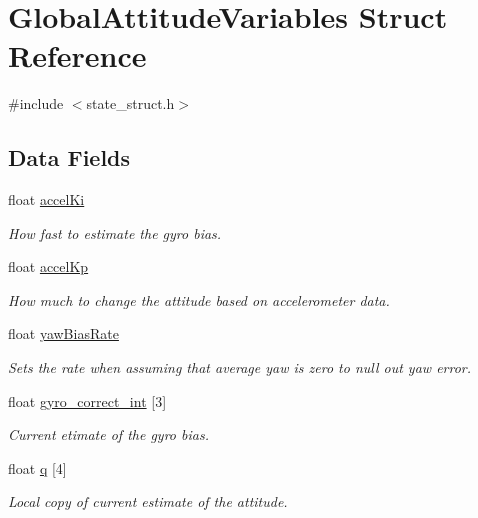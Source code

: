 \hypertarget{struct_global_attitude_variables}{\section{Global\-Attitude\-Variables Struct Reference}
\label{struct_global_attitude_variables}
}


{\ttfamily \#include $<$state\-\_\-struct.\-h$>$}

\subsection*{Data Fields}
\begin{DoxyCompactItemize}
\item 
float \hyperlink{group___state_ga0a9a06d18d9d208192de6edeed98fbe8}{accel\-Ki}
\begin{DoxyCompactList}\small\item\em How fast to estimate the gyro bias. \end{DoxyCompactList}\item 
float \hyperlink{group___state_gaf9246ddec8582b6b47b752019c29b2e4}{accel\-Kp}
\begin{DoxyCompactList}\small\item\em How much to change the attitude based on accelerometer data. \end{DoxyCompactList}\item 
float \hyperlink{group___state_ga0c53c008608a5724b2d563fd5b560905}{yaw\-Bias\-Rate}
\begin{DoxyCompactList}\small\item\em Sets the rate when assuming that average yaw is zero to null out yaw error. \end{DoxyCompactList}\item 
float \hyperlink{group___state_gac754011cf55a0c78cb770e48567802ba}{gyro\-\_\-correct\-\_\-int} \mbox{[}3\mbox{]}
\begin{DoxyCompactList}\small\item\em Current etimate of the gyro bias. \end{DoxyCompactList}\item 
float \hyperlink{group___state_ga34a6662a3aea49780925afa629a917cf}{q} \mbox{[}4\mbox{]}
\begin{DoxyCompactList}\small\item\em Local copy of current estimate of the attitude. \end{DoxyCompactList}\item 

\end{DoxyCompactItemize}
